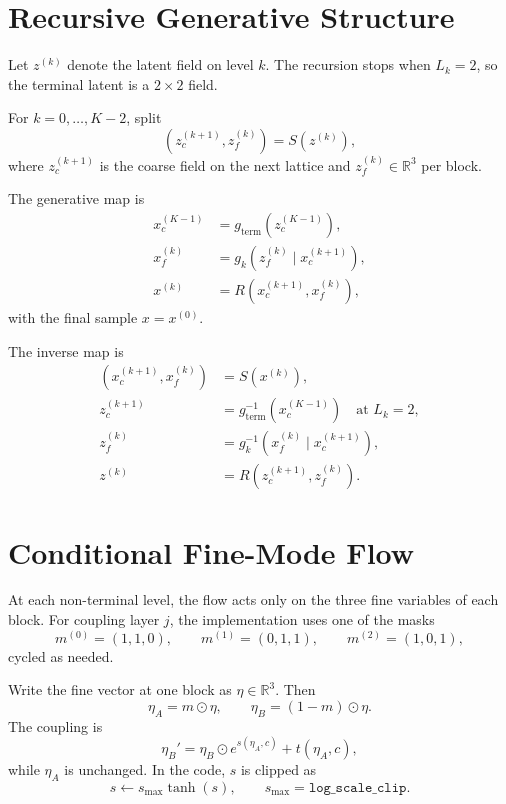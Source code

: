 \documentclass[11pt]{article}
\begin{document}
\section{Recursive Generative Structure}

Let $z^{(k)}$ denote the latent field on level $k$. The recursion stops when
$L_k=2$, so the terminal latent is a $2\times 2$ field.

For $k=0,\dots,K-2$, split
\begin{equation}
(z_c^{(k+1)},z_f^{(k)}) = S(z^{(k)}),
\end{equation}
where $z_c^{(k+1)}$ is the coarse field on the next lattice and
$z_f^{(k)}\in\mathbb{R}^{3}$ per block.

The generative map is
\begin{align}
x_c^{(K-1)} &= g_{\mathrm{term}}(z_c^{(K-1)}), \\
x_f^{(k)} &= g_k\!\left(z_f^{(k)} \mid x_c^{(k+1)}\right), \\
x^{(k)} &= R\!\left(x_c^{(k+1)},x_f^{(k)}\right),
\end{align}
with the final sample $x=x^{(0)}$.

The inverse map is
\begin{align}
(x_c^{(k+1)},x_f^{(k)}) &= S(x^{(k)}), \\
z_c^{(k+1)} &= g_{\mathrm{term}}^{-1}(x_c^{(K-1)}) \quad\text{at }L_k=2, \\
z_f^{(k)} &= g_k^{-1}\!\left(x_f^{(k)} \mid x_c^{(k+1)}\right), \\
z^{(k)} &= R\!\left(z_c^{(k+1)},z_f^{(k)}\right).
\end{align}

\section{Conditional Fine-Mode Flow}

At each non-terminal level, the flow acts only on the three fine variables of
each block. For coupling layer $j$, the implementation uses one of the masks
\begin{equation}
m^{(0)}=(1,1,0),\qquad
m^{(1)}=(0,1,1),\qquad
m^{(2)}=(1,0,1),
\end{equation}
cycled as needed.

Write the fine vector at one block as $\eta\in\mathbb{R}^3$. Then
\begin{equation}
\eta_A = m\odot \eta,\qquad \eta_B=(1-m)\odot \eta.
\end{equation}
The coupling is
\begin{equation}
\eta_B' = \eta_B \odot e^{s(\eta_A,c)} + t(\eta_A,c),
\end{equation}
while $\eta_A$ is unchanged. In the code, $s$ is clipped as
\begin{equation}
s \leftarrow s_{\max}\tanh(s),\qquad s_{\max}=\texttt{log\_scale\_clip}.
\end{equation}
\end{document}
